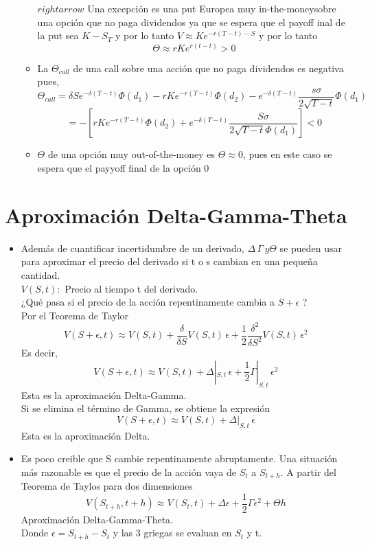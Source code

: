 \documentclass[12pts]{extarticle}
\begin{document}
\begin{itemize}
\begin{itemize}
$rightarrow$ Una excepción es una put Europea muy in-the-moneysobre una opción que no paga dividendos ya que se espera que el payoff inal de la put sea $K-S_T$ y por lo tanto $V \approx Ke^{-r(T-t)-S}$ y por lo tanto $$\Theta \approx rKe^{r(t-t)}>0$$
\item La $\Theta_{call}$ de una call sobre una acción que no paga dividendos es negativa pues,
$$\Theta_{call}=\delta Se^{-\delta(T-t)}\Phi(d_1)-rKe^{-r(T-t)}\Phi(d_2)-e^{-\delta (T-t)}\frac{s \sigma}{2\sqrt{T-t}}\Phi(d_1)$$
$$=-[rKe^{-r(T-t)}\Phi(d_2)+e^{-\delta(T-t)}\frac{S\sigma}{2\sqrt{T-t}\Phi(d_1)}]<0$$
\item $\Theta$ de una opción muy out-of-the-money es $\Theta \approx 0$, pues en este caso se espera que el payyoff final de la opción 0
\end{itemize}
\end{itemize}
\section{Aproximación Delta-Gamma-Theta}
\begin{itemize}
\item Además de cuantificar incertidumbre de un derivado, $\Delta\, \Gamma \, y \Theta$ se pueden usar para aproximar el precio del derivado si t o s cambian en una pequeña cantidad. \\
$V(S,t):$ Precio al tiempo t del derivado. \\ ¿Qué pasa si el precio de la acción repentinamente cambia a $S+\epsilon$ ?
\\ 
Por el Teorema de Taylor
$$V(S+\epsilon, t)\approx V(S,t)+\frac{\delta}{\delta S}V(S,t)\, \epsilon +\frac{1}{2} \frac{\delta^2}{\delta S^2}V(S,t)\, \epsilon^2$$
Es decir, 
$$V(S+\epsilon, t)\approx V(S,t)+\Delta|_{S,t} \, \epsilon +\frac{1}{2} \Gamma |_{S,t} \, \epsilon^2$$
Esta es la aproximación Delta-Gamma.
\\ 
Si se elimina el término de Gamma, se obtiene la expresión
$$V(S+\epsilon, t)\approx V(S,t)+\Delta|_{S,t} \, \epsilon $$
Esta es la aproximación Delta. 
\item Es poco creible que S cambie repentinamente abruptamente. Una situación más razonable es que el precio de la acción vaya de $S_t$ a $S_{t+h}$. A partir del Teorema de Taylos para dos dimensiones
$$V(S_{t+h},t+h)\approx V(S_t,t)+\Delta \epsilon +\frac{1}{2}\Gamma \epsilon^2 + \Theta h $$
Aproximación Delta-Gamma-Theta. 
\\ Donde $\epsilon=S_{t+h}-S_t$ y las 3 griegas se evaluan en $S_t$ y t. 
\end{itemize}
\end{document}
